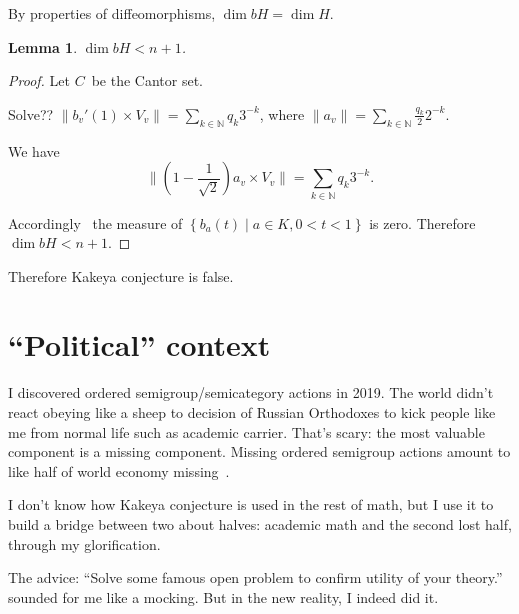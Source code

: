 \documentclass[oneside,draft]{amsart}
\newcommand{\setcond}[2]{\left\{#1\mid#2\right\}}
\newcommand{\norm}[1]{\lVert #1\rVert}
\newtheorem{lem}{Lemma}
\begin{document}
By properties of diffeomorphisms, $\dim bH = \dim H$.

\begin{lem}
$\dim bH<n+1$.
\end{lem}

\begin{proof}
Let $C$~be the Cantor set.

Solve?? $\norm{b_v'(1)\times V_v} = \sum_{k\in\mathbb{N}}q_k 3^{-k}$, where $\norm{a_v} = \sum_{k\in\mathbb{N}}\frac{q_k}{2} 2^{-k}$.

We have
\[ \norm{\left(1-\frac{1}{\sqrt{2}}\right)a_v\times V_v} = \sum_{k\in\mathbb{N}}q_k 3^{-k}. \]

Accordingly~\cite{zero-measure} the measure of $\setcond{b_a(t)}{a\in K, 0<t<1}$ is zero.
Therefore $\dim bH<n+1$.
\end{proof}

Therefore Kakeya conjecture is false.

\section{``Political'' context}

I discovered ordered semigroup/semicategory actions in 2019. The world didn't react obeying like a sheep to decision of Russian Orthodoxes to kick people like me from normal life such as academic carrier. That's scary: the most valuable component is a missing component. Missing ordered semigroup actions amount to like half of world economy missing~\cite{osa-important}.

I don't know how Kakeya conjecture is used in the rest of math, but I use it to build a bridge between two about halves: academic math and the second lost half, through my glorification.

The advice: ``Solve some famous open problem to confirm utility of your theory.'' sounded for me like a mocking. But in the new reality, I indeed did it.



\end{document}
